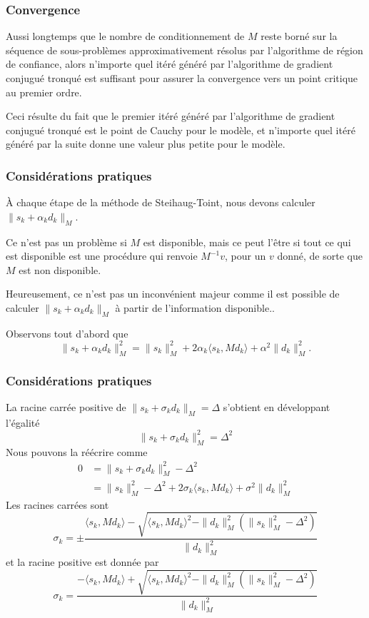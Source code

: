 \documentclass[usepdftitle=false,aspectratio=169]{beamer}
\begin{document}
\begin{frame}
\frametitle{Convergence}

Aussi longtemps que le nombre de conditionnement de $M$ reste borné sur la séquence de sous-problèmes approximativement résolus par l'algorithme de région de confiance, alors n'importe quel itéré généré par l'algorithme de gradient conjugué tronqué est suffisant pour assurer la convergence vers un point critique au premier ordre.

\mbox{}

Ceci résulte du fait que le premier itéré généré par l'algorithme de gradient conjugué tronqué est le point de Cauchy pour le modèle, et n'importe quel itéré généré par la suite donne une valeur plus petite pour le modèle.

\end{frame}

\begin{frame}
\frametitle{Considérations pratiques}

À chaque étape de la méthode de Steihaug-Toint, nous devons calculer $\| s_k + \alpha_k d_k\|_M$.

\mbox{}

Ce n'est pas un problème si $M$ est disponible, mais ce peut l'être si tout ce qui est disponible est une procédure qui renvoie $M^{-1}v$, pour un $v$ donné, de sorte que $M$ est non disponible.

\mbox{}

Heureusement, ce n'est pas un inconvénient majeur comme il est possible de calculer  $\| s_k + \alpha_k d_k\|_M$ à partir de l'information disponible..

\mbox{}

Observons tout d'abord que
$$
\| s_k + \alpha_k d_k\|^2_M = \| s_k \|_M^2 + 2\alpha_k \langle s_k, Md_k \rangle
+ \alpha^2 \| d_k \|^2_M.
$$

\end{frame}

\begin{frame}
\frametitle{Considérations pratiques}

La racine carrée positive de $\| s_k + \sigma_k d_k\|_M = \Delta$ s'obtient en développant l'égalité
$$
\| s_k + \sigma_k d_k\|^2_M = \Delta^2
$$
Nous pouvons la réécrire comme
\begin{align*}
0 &= \| s_k + \sigma_k d_k\|^2_M - \Delta^2 \\
&= \| s_k \|_M^2 -  \Delta^2 + 2\sigma_k \langle s_k, Md_k \rangle
+ \sigma^2 \| d_k \|^2_M
\end{align*}
Les racines carrées sont
$$
\sigma_k = \pm \frac{\langle s_k, Md_k \rangle - \sqrt{\langle s_k, Md_k \rangle^2-\| d_k \|_M^2(\|s_k\|^2_M - \Delta^2 )}}{\| d_k \|_M^2}
$$
et la racine positive est donnée par
$$
\sigma_k = \frac{-\langle s_k, Md_k \rangle + \sqrt{\langle s_k, Md_k \rangle^2-\| d_k \|_M^2(\|s_k\|^2_M - \Delta^2 )}}{\| d_k \|_M^2}
$$

\end{frame}
\end{document}
